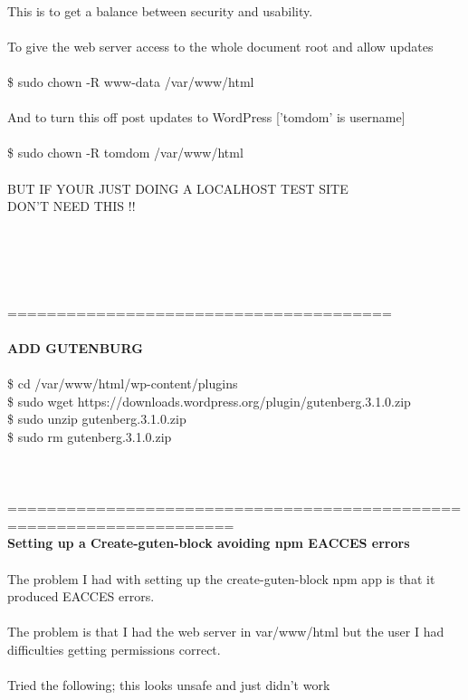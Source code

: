\documentclass[10pt,a4paper]{article}
\begin{document}
{{{{{{{{{{{{{{{{{{{{\\
This is to get a balance between security and usability.\\
\\
To give the web server access to the whole document root and allow updates\\
\\
\$ sudo chown -R www-data /var/www/html}{\large \\
\\
And to turn this off post updates to WordPress ['tomdom' is username]\\
\\
\$ sudo chown -R tomdom /var/www/html}{\large \\
\\
BUT IF YOUR JUST DOING A LOCALHOST TEST SITE \\
DON'T NEED THIS !!\\
\\
\\
\\
\\
\\
=======================================\\
\\
\textbf{ADD GUTENBURG}}{\large \\
\\
\$ cd /var/www/html/wp-content/plugins}{\large \\
\$ sudo wget https://downloads.wordpress.org/plugin/gutenberg.3.1.0.zip}{\large \\
\$ sudo unzip gutenberg.3.1.0.zip\\
\$ sudo rm gutenberg.3.1.0.zip\\
\\
\\
\\
=====================================================================}\textbf{{\Large \\
Setting up a Create-guten-block avoiding npm EACCES errors }}{\large \\
\\
The problem I had with setting up the create-guten-block npm app is that it produced EACCES errors.\\
\\
The problem is that I had the web server in var/www/html but the user I had difficulties getting permissions correct.\\
\\
Tried the following; this looks unsafe and just didn't work\\
}}}}}}}}}}}}}}}}}}}}
\end{document}
